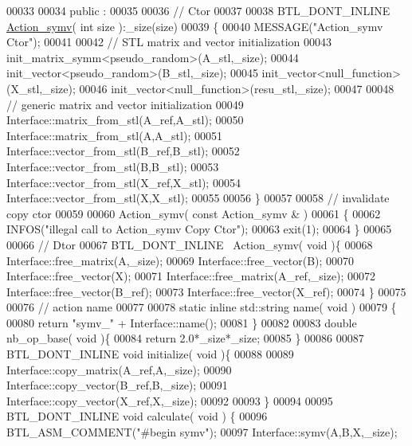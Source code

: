 \begin{DoxyCode}
00033 
00034 public :
00035 
00036   \textcolor{comment}{// Ctor}
00037 
00038   BTL\_DONT\_INLINE \hyperlink{class_action__symv}{Action\_symv}( \textcolor{keywordtype}{int} size ):\_size(size)
00039   \{
00040     MESSAGE(\textcolor{stringliteral}{"Action\_symv Ctor"});
00041 
00042     \textcolor{comment}{// STL matrix and vector initialization}
00043     init\_matrix\_symm<pseudo\_random>(A\_stl,\_size);
00044     init\_vector<pseudo\_random>(B\_stl,\_size);
00045     init\_vector<null\_function>(X\_stl,\_size);
00046     init\_vector<null\_function>(resu\_stl,\_size);
00047 
00048     \textcolor{comment}{// generic matrix and vector initialization}
00049     Interface::matrix\_from\_stl(A\_ref,A\_stl);
00050     Interface::matrix\_from\_stl(A,A\_stl);
00051     Interface::vector\_from\_stl(B\_ref,B\_stl);
00052     Interface::vector\_from\_stl(B,B\_stl);
00053     Interface::vector\_from\_stl(X\_ref,X\_stl);
00054     Interface::vector\_from\_stl(X,X\_stl);
00055 
00056   \}
00057 
00058   \textcolor{comment}{// invalidate copy ctor}
00059 
00060   Action\_symv( \textcolor{keyword}{const}  Action\_symv & )
00061   \{
00062     INFOS(\textcolor{stringliteral}{"illegal call to Action\_symv Copy Ctor"});
00063     exit(1);
00064   \}
00065 
00066   \textcolor{comment}{// Dtor}
00067   BTL\_DONT\_INLINE ~Action\_symv( \textcolor{keywordtype}{void} )\{
00068     Interface::free\_matrix(A,\_size);
00069     Interface::free\_vector(B);
00070     Interface::free\_vector(X);
00071     Interface::free\_matrix(A\_ref,\_size);
00072     Interface::free\_vector(B\_ref);
00073     Interface::free\_vector(X\_ref);
00074   \}
00075 
00076   \textcolor{comment}{// action name}
00077 
00078   \textcolor{keyword}{static} \textcolor{keyword}{inline} std::string name( \textcolor{keywordtype}{void} )
00079   \{
00080     \textcolor{keywordflow}{return} \textcolor{stringliteral}{"symv\_"} + Interface::name();
00081   \}
00082 
00083   \textcolor{keywordtype}{double} nb\_op\_base( \textcolor{keywordtype}{void} )\{
00084     \textcolor{keywordflow}{return} 2.0*\_size*\_size;
00085   \}
00086 
00087   BTL\_DONT\_INLINE  \textcolor{keywordtype}{void} initialize( \textcolor{keywordtype}{void} )\{
00088 
00089     Interface::copy\_matrix(A\_ref,A,\_size);
00090     Interface::copy\_vector(B\_ref,B,\_size);
00091     Interface::copy\_vector(X\_ref,X,\_size);
00092 
00093   \}
00094 
00095   BTL\_DONT\_INLINE \textcolor{keywordtype}{void} calculate( \textcolor{keywordtype}{void} ) \{
00096       BTL\_ASM\_COMMENT(\textcolor{stringliteral}{"#begin symv"});
00097       Interface::symv(A,B,X,\_size);

\end{DoxyCode}
